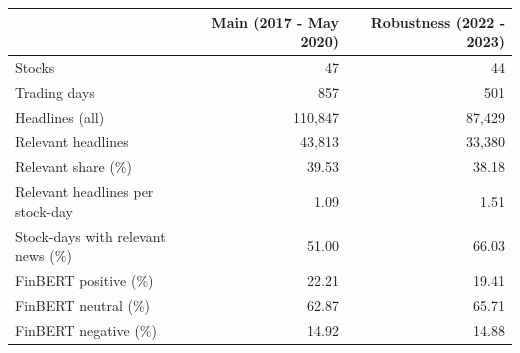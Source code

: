 \begin{tabular}{lrr}
\toprule
 & Main (2017 - May 2020) & Robustness (2022 - 2023) \\
\midrule
Stocks & 47 & 44 \\
Trading days & 857 & 501 \\
Headlines (all) & 110,847 & 87,429 \\
Relevant headlines & 43,813 & 33,380 \\
Relevant share (\%) & 39.53 & 38.18 \\
Relevant headlines per stock-day & 1.09 & 1.51 \\
Stock-days with relevant news (\%) & 51.00 & 66.03 \\
FinBERT positive (\%) & 22.21 & 19.41 \\
FinBERT neutral (\%) & 62.87 & 65.71 \\
FinBERT negative (\%) & 14.92 & 14.88 \\
\bottomrule
\end{tabular}

